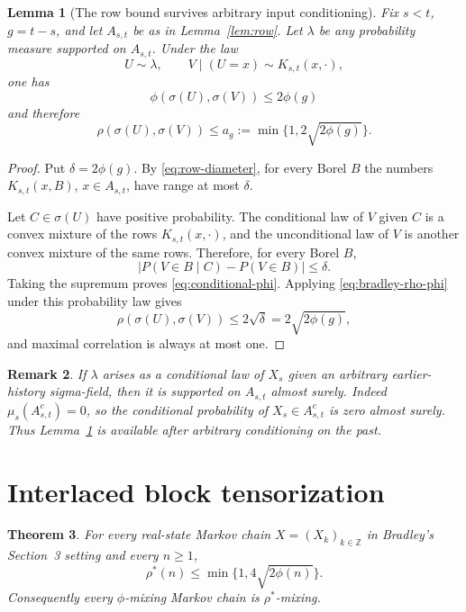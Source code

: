 \documentclass[11pt]{article}
\newtheorem{theorem}{Theorem}
\newtheorem{lemma}[theorem]{Lemma}
\newtheorem{remark}[theorem]{Remark}
\begin{document}
\begin{lemma}[The row bound survives arbitrary input conditioning]\label{lem:arbitrary-input}
Fix $s<t$, $g=t-s$, and let $A_{s,t}$ be as in Lemma~\ref{lem:row}.  Let $\lambda$ be any probability measure supported on $A_{s,t}$.  Under the law
\[
 U\sim\lambda,\qquad V\mid(U=x)\sim K_{s,t}(x,\cdot),
\]
one has
\begin{equation}\label{eq:conditional-phi}
 \phi(\sigma(U),\sigma(V))\le 2\phi(g)
\end{equation}
and therefore
\begin{equation}\label{eq:conditional-rho}
 \rho(\sigma(U),\sigma(V))
 \le a_g:=\min\{1,2\sqrt{2\phi(g)}\}.
\end{equation}
\end{lemma}

\begin{proof}
Put $\delta=2\phi(g)$.  By \eqref{eq:row-diameter}, for every Borel $B$ the numbers $K_{s,t}(x,B)$, $x\in A_{s,t}$, have range at most $\delta$.

Let $C\in\sigma(U)$ have positive probability.  The conditional law of $V$ given $C$ is a convex mixture of the rows $K_{s,t}(x,\cdot)$, and the unconditional law of $V$ is another convex mixture of the same rows.  Therefore, for every Borel $B$,
\[
 |P(V\in B\mid C)-P(V\in B)|\le\delta.
\]
Taking the supremum proves \eqref{eq:conditional-phi}.  Applying \eqref{eq:bradley-rho-phi} under this probability law gives
\[
 \rho(\sigma(U),\sigma(V))\le 2\sqrt{\delta}
 =2\sqrt{2\phi(g)},
\]
and maximal correlation is always at most one.
\end{proof}

\begin{remark}\label{rem:conditional-support}
If $\lambda$ arises as a conditional law of $X_s$ given an arbitrary earlier-history sigma-field, then it is supported on $A_{s,t}$ almost surely.  Indeed $\mu_s(A_{s,t}^c)=0$, so the conditional probability of $X_s\in A_{s,t}^c$ is zero almost surely.  Thus Lemma~\ref{lem:arbitrary-input} is available after arbitrary conditioning on the past.
\end{remark}

\section{Interlaced block tensorization}

\begin{theorem}\label{thm:main}
For every real-state Markov chain $X=(X_k)_{k\in\mathbb Z}$ in Bradley's Section~3 setting and every $n\ge1$,
\begin{equation}\label{eq:main-bound}
 \boxed{\quad
 \rho^{*}(n)\le \min\{1,4\sqrt{2\phi(n)}\}.
 \quad}
\end{equation}
Consequently every $\phi$-mixing Markov chain is $\rho^{*}$-mixing.
\end{theorem}
\end{document}

